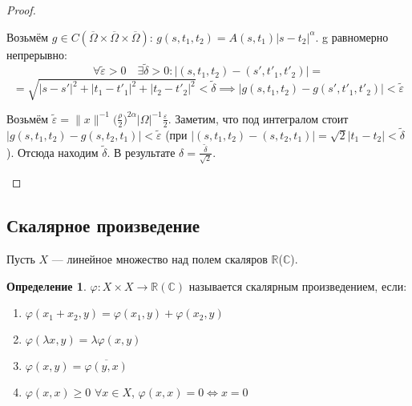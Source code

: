 \documentclass[11pt,openany,a4paper]{scrartcl}
\theoremstyle{plain}
\theoremstyle{definition}
\newtheorem{definition}[theorem]{Определение}
\newcommand\mb{\mathbb}
\newcommand\real{\mb R}
\newcommand{\complex}{\mb C}
\newcommand\ol{\overline}
\begin{document}
\begin{proof}
\begin{enumerate}
        Возьмём $g \in C(\ol \Omega \times \ol \Omega \times \ol \Omega)$:
        $g(s, t_1, t_2) = A(s, t_1)|s-t_2|^\alpha$. g равномерно непрерывно:
        $$
        \forall \widetilde\varepsilon > 0\quad \exists \widetilde\delta > 0:
        |(s, t_1, t_2) - (s', t'_1, t'_2)| =
        $$
        $$
        =\sqrt{|s-s'|^2 + |t_1 - t'_1|^2 + |t_2 - t'_2|^2} < \widetilde\delta \implies
        |g(s, t_1, t_2) - g(s', t'_1, t'_2)| < \widetilde\varepsilon
        $$
        
        Возьмём $\widetilde\varepsilon = \|x\|^{-1}\big(\frac{\rho}{2}\big)^{2\alpha}
        |\Omega|^{-1}
        \frac{\varepsilon}{2}$.
        Заметим, что под интегралом стоит
        $|g(s, t_1, t_2) - g(s, t_2, t_1)| < \widetilde\varepsilon$
        (при $|(s, t_1, t_2) - (s, t_2, t_1)| = \sqrt{2}|t_1 - t_2| < \widetilde\delta$).
        Отсюда находим $\widetilde\delta$.
        В результате $\delta = \frac{\widetilde\delta}{\sqrt{2}}$.
    \end{enumerate}
\end{proof}

\subsection{Скалярное произведение}

Пусть $X$ — линейное множество над полем скаляров $\real$($\complex$).

\begin{definition}
    $\varphi: X \times X \to \real(\complex)$ называется скалярным произведением,
    если:
    \begin{enumerate}
        \item $\varphi(x_1 + x_2, y) = \varphi(x_1, y) + \varphi(x_2, y)$
        \item $\varphi(\lambda x, y) = \lambda \varphi(x, y)$
        \item $\varphi(x, y) = \ol{\varphi(y, x)}$
        \item $\varphi(x, x) \geqslant 0$ $\forall x \in X$,
        $\varphi(x, x) = 0 \iff x = 0$
    \end{enumerate}
\end{definition}
\end{document}
